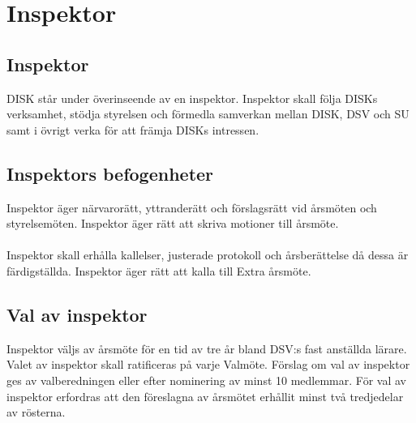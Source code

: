 \clearpage
\section{Inspektor}
\label{sec:inspektor}

	\subsection{Inspektor}
	\label{subsec:inspektor}
		DISK står under överinseende av en inspektor. Inspektor skall följa DISKs verksamhet, stödja styrelsen och förmedla samverkan mellan DISK, DSV och SU samt i övrigt verka för att främja DISKs intressen.

	\subsection{Inspektors befogenheter}
	\label{subsec:inspektorsbefogenheter}
		Inspektor äger närvarorätt, yttranderätt och förslagsrätt vid årsmöten och styrelsemöten. Inspektor äger rätt att skriva motioner till årsmöte.\\ \\
Inspektor skall erhålla kallelser, justerade protokoll och årsberättelse då dessa är färdigställda. Inspektor äger rätt att kalla till Extra årsmöte.

	\subsection{Val av inspektor}
	\label{subsec:valavinspektor}
		Inspektor väljs av årsmöte för en tid av tre år bland DSV:s fast anställda lärare. Valet av inspektor skall ratificeras på varje Valmöte. Förslag om val av inspektor ges av valberedningen eller efter nominering av minst 10 medlemmar. För val av inspektor erfordras att den föreslagna av årsmötet erhållit minst två tredjedelar av rösterna.
